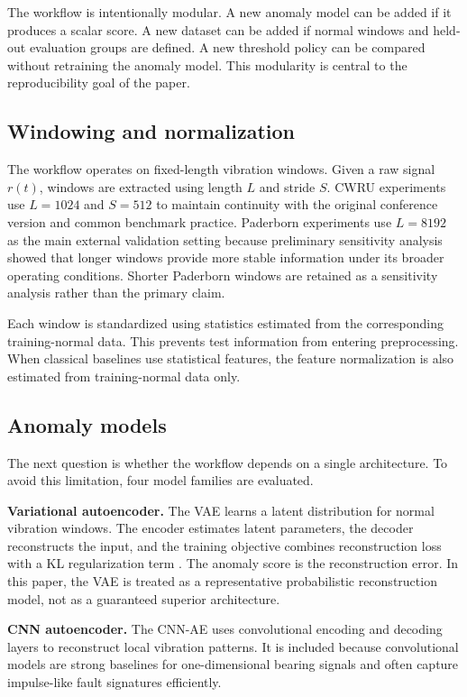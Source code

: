 \documentclass[pdflatex,sn-mathphys-num]{sn-jnl}
\begin{document}
The workflow is intentionally modular. A new anomaly model can be added if it produces a scalar score. A new dataset can be added if normal windows and held-out evaluation groups are defined. A new threshold policy can be compared without retraining the anomaly model. This modularity is central to the reproducibility goal of the paper.

\subsection{Windowing and normalization}

The workflow operates on fixed-length vibration windows. Given a raw signal $r(t)$, windows are extracted using length $L$ and stride $S$. CWRU experiments use $L=1024$ and $S=512$ to maintain continuity with the original conference version and common benchmark practice. Paderborn experiments use $L=8192$ as the main external validation setting because preliminary sensitivity analysis showed that longer windows provide more stable information under its broader operating conditions. Shorter Paderborn windows are retained as a sensitivity analysis rather than the primary claim.

Each window is standardized using statistics estimated from the corresponding training-normal data. This prevents test information from entering preprocessing. When classical baselines use statistical features, the feature normalization is also estimated from training-normal data only.

\subsection{Anomaly models}

The next question is whether the workflow depends on a single architecture. To avoid this limitation, four model families are evaluated.

\textbf{Variational autoencoder.} The VAE learns a latent distribution for normal vibration windows. The encoder estimates latent parameters, the decoder reconstructs the input, and the training objective combines reconstruction loss with a KL regularization term \citep{kingma2014vae}. The anomaly score is the reconstruction error. In this paper, the VAE is treated as a representative probabilistic reconstruction model, not as a guaranteed superior architecture.

\textbf{CNN autoencoder.} The CNN-AE uses convolutional encoding and decoding layers to reconstruct local vibration patterns. It is included because convolutional models are strong baselines for one-dimensional bearing signals and often capture impulse-like fault signatures efficiently.
\end{document}
